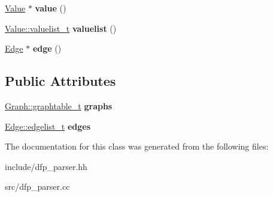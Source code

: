 \begin{DoxyCompactItemize}
\item 
\hyperlink{class_d_f_p_1_1_value}{Value} $\ast$ {\bfseries value} ()\hypertarget{class_d_f_p_1_1_parser_ab2ab2eccceabc1400575f0340269fd6a}{}\label{class_d_f_p_1_1_parser_ab2ab2eccceabc1400575f0340269fd6a}

\item 
\hyperlink{class_d_f_p_1_1_value_a2ca981be3c47c7d23213c08379d3c947}{Value\+::valuelist\+\_\+t} {\bfseries valuelist} ()\hypertarget{class_d_f_p_1_1_parser_af5c91f86af0f7e1d5d2440ee5fbf9a5e}{}\label{class_d_f_p_1_1_parser_af5c91f86af0f7e1d5d2440ee5fbf9a5e}

\item 
\hyperlink{class_d_f_p_1_1_edge}{Edge} $\ast$ {\bfseries edge} ()\hypertarget{class_d_f_p_1_1_parser_a5f5041ecadedaf2aa149d78fdd104735}{}\label{class_d_f_p_1_1_parser_a5f5041ecadedaf2aa149d78fdd104735}

\end{DoxyCompactItemize}
\subsection*{Public Attributes}
\begin{DoxyCompactItemize}
\item 
\hyperlink{class_d_f_p_1_1_graph_ae35638adb932f3b7fd545ac09ea34c5a}{Graph\+::graphtable\+\_\+t} {\bfseries graphs}\hypertarget{class_d_f_p_1_1_parser_af97bf674f2c2460b71131afa38437e7f}{}\label{class_d_f_p_1_1_parser_af97bf674f2c2460b71131afa38437e7f}

\item 
\hyperlink{class_d_f_p_1_1_edge_a71ccd1900dbfda5591981064738f60af}{Edge\+::edgelist\+\_\+t} {\bfseries edges}\hypertarget{class_d_f_p_1_1_parser_a3de52a397448d3de34d4ef5c84798f3a}{}\label{class_d_f_p_1_1_parser_a3de52a397448d3de34d4ef5c84798f3a}

\end{DoxyCompactItemize}


The documentation for this class was generated from the following files\+:\begin{DoxyCompactItemize}
\item 
include/dfp\+\_\+parser.\+hh\item 
src/dfp\+\_\+parser.\+cc\end{DoxyCompactItemize}
